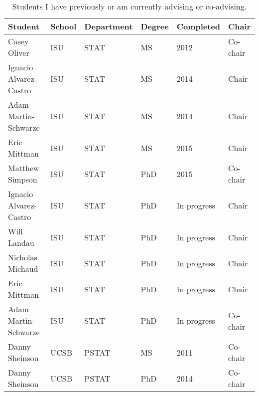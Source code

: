\begin{table}[h]
\centering
\begin{tabular}{llllll}
  \hline
Student & School & Department & Degree & Completed & Chair \\ 
  \hline
Casey Oliver & ISU & STAT & MS & 2012 & Co-chair \\ 
  Ignacio Alvarez-Castro & ISU & STAT & MS & 2014 & Chair \\ 
  Adam Martin-Schwarze & ISU & STAT & MS & 2014 & Chair \\ 
  Eric Mittman & ISU & STAT & MS & 2015 & Chair \\ 
  Matthew Simpson & ISU & STAT & PhD & 2015 & Co-chair \\ 
  Ignacio Alvarez-Castro & ISU & STAT & PhD & In progress & Chair \\ 
  Will Landau & ISU & STAT & PhD & In progress & Chair \\ 
  Nicholas Michaud & ISU & STAT & PhD & In progress & Chair \\ 
  Eric Mittman & ISU & STAT & PhD & In progress & Chair \\ 
  Adam Martin-Schwarze & ISU & STAT & PhD & In progress & Co-chair \\ 
  Danny Sheinson & UCSB & PSTAT & MS & 2011 & Co-chair \\ 
  Danny Sheinson & UCSB & PSTAT & PhD & 2014 & Co-chair \\ 
   \hline
\end{tabular}
\caption{Students I have previously or am currently advising or co-advising.} 
\label{tab:studentcommittees}
\end{table}
